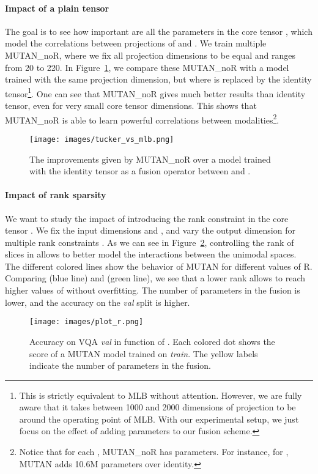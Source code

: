 \documentclass[10pt,twocolumn,letterpaper]{article}
\begin{document}
\paragraph{Impact of a plain tensor}
The goal is to see how important are all the parameters in the core tensor , which  model the correlations between projections of  and . We train multiple MUTAN\_noR, where we fix all projection dimensions to be equal  and  ranges from 20 to 220. In Figure~\ref{tucker_vs_mlb}, we compare these MUTAN\_noR with a model trained with the same projection dimension, but where  is replaced by the 
identity tensor\footnote{This is strictly equivalent to MLB \cite{Kim2017} without attention. However, we are fully aware that it takes between 1000 and 2000 dimensions of projection to be around the operating point of MLB. With our experimental setup, we just focus on the effect of adding parameters to our fusion scheme.}. One can see that MUTAN\_noR gives much better results than identity tensor, even for very small core tensor dimensions. This shows that MUTAN\_noR is able to learn powerful correlations between modalities\footnote{Notice that for each , MUTAN\_noR has  parameters. For instance, for , MUTAN adds 10.6M parameters over identity.}.
\begin{figure}
\texttt{[image: images/tucker\_vs\_mlb.png]}
\caption{\label{tucker_vs_mlb} The improvements given by MUTAN\_noR over a model trained with the identity tensor as a fusion operator between  and .}
\end{figure}
\vspace{-0.3cm}
\paragraph{Impact of rank sparsity}
We want to study the impact of introducing the rank constraint in the core tensor . We fix the input dimensions  and , and vary the output dimension  for multiple rank constraints . As we can see in Figure~\ref{plot:r}, controlling the rank of slices in  allows to better model the interactions between the unimodal spaces. The different colored lines show the behavior of MUTAN for different values of R. Comparing  (blue line) and  (green line), we see that a lower rank allows to reach higher values of  without overfitting. The number of parameters in the fusion is lower, and the accuracy on the \textit{val} split is higher. 
\begin{figure}
 \texttt{[image: images/plot\_r.png]}
\caption{\label{plot:r} Accuracy on VQA \textit{val} in function of . Each colored dot shows the score of a MUTAN model trained on \textit{train}. The yellow labels indicate the number of parameters in the fusion.}
\end{figure}
\vspace{-0.3cm}
\end{document}
